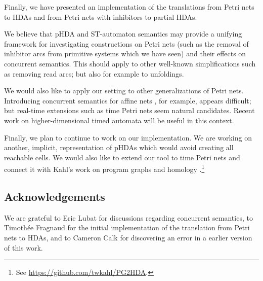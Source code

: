 \documentclass[runningheads,envcountsame]{llncs}
\begin{document}
Finally, we have presented an implementation of the translations from Petri nets to HDAs
and from Petri nets with inhibitors to partial HDAs.


We believe that pHDA and ST-automaton semantics may provide a unifying framework
for investigating constructions on Petri nets
(such as the removal of inhibitor arcs from primitive systems which we have seen)
and their effects on concurrent semantics.
This should apply to other well-known simplifications such as removing read arcs;
but also for example to unfoldings.

We would also like
to apply our setting to other generalizations of Petri nets.
Introducing concurrent semantics for affine nets \cite{DBLP:conf/fsttcs/BonnetFP12}, for example, appears difficult;
but real-time extensions such as time Petri nets  \cite{merlin1974study} seem natural candidates.
Recent work on higher-dimensional timed automata \cite{%
  conf/apn/AmraneBCF24,
  DBLP:journals/corr/abs-2401-17444}
will be useful in this context.

Finally, we plan to continue to work on our implementation.
We are working on another, implicit, representation of pHDAs
which would avoid creating all reachable cells.
We would also like to extend our tool to time Petri nets
and connect it with Kahl's work on program graphs and homology \cite{DBLP:journals/jact/Kahl24}.\footnote{%
  See \url{https://github.com/twkahl/PG2HDA}.}

\subsection*{Acknowledgements}

We are grateful to Eric Lubat for discussions regarding concurrent semantics,
to Timothée Fragnaud for the initial implementation of the translation from Petri nets to HDAs,
and to Cameron Calk for discovering an error in a earlier version of this work.
\end{document}
